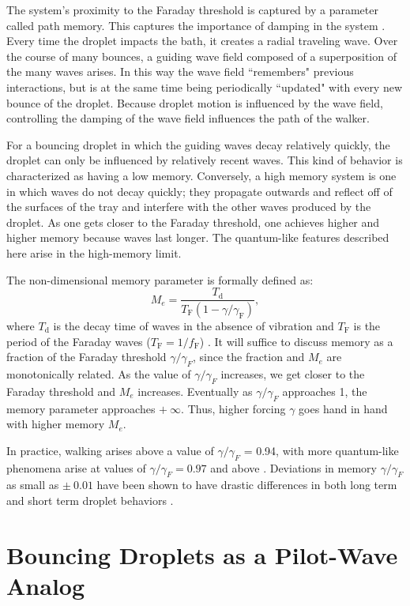             The system's proximity to the Faraday threshold is captured by a parameter called path memory. This captures the importance of damping in the system . Every time the droplet impacts the bath, it creates a radial traveling wave. Over the course of many bounces, a guiding wave field composed of a superposition of the many waves arises. In this way the wave field ``remembers" previous interactions, but is at the same time being periodically ``updated" with every new bounce of the droplet. Because droplet motion is influenced by the wave field, controlling the damping of the wave field influences the path of the walker. 
            
For a bouncing droplet in which the guiding waves decay relatively quickly, the droplet can only be influenced by relatively recent waves. This kind of behavior is characterized as having a low memory. Conversely, a high memory system is one in which waves do not decay quickly; they propagate outwards and reflect off of the surfaces of the tray and interfere with the other waves produced by the droplet. As one gets closer to the Faraday threshold, one achieves higher and higher memory because waves last longer. The quantum-like features described here arise in the high-memory limit. 

The non-dimensional memory parameter is formally defined as:
$$M_e = \frac{T_\mathrm{d}}{T_\mathrm{F}(1-\gamma/\gamma_\mathrm{F})},$$
where $T_\mathrm{d}$ is the decay time of waves in the absence of vibration and $T_\mathrm{F}$ is the period of the Faraday waves ($T_\mathrm{F} = 1/f_\mathrm{F}$) . It will suffice to discuss memory as a fraction of the Faraday threshold $\gamma/\gamma_{F}$, since the fraction and $M_e$ are monotonically related. As the value of $\gamma/\gamma_{F}$ increases, we get closer to the Faraday threshold and $M_e$ increases. Eventually as $\gamma/\gamma_{F}$ approaches 1, the memory parameter approaches $+~\infty$. Thus, higher forcing $\gamma$ goes hand in hand with higher memory $M_e$. 

In practice, walking arises above a value of $\gamma/\gamma_{F}$ = 0.94, with more quantum-like phenomena arise at values of $\gamma/\gamma_{F} = 0.97$ and above . Deviations in memory $\gamma/\gamma_{F}$ as small as $\pm~0.01$ have been shown to have drastic differences in both long term and short term droplet behaviors .
            
            
\section{Bouncing Droplets as a Pilot-Wave Analog}   

